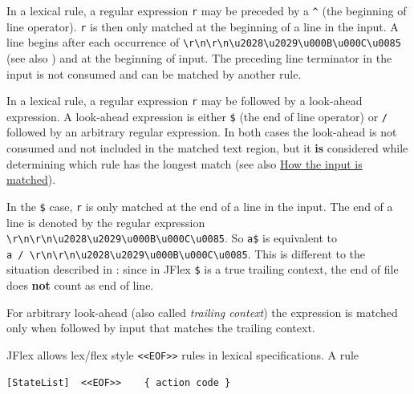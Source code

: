 In a lexical rule, a regular expression \texttt{r} may be preceded by a
\texttt{\^{}} (the beginning of line operator). \texttt{r} is then only
matched at the beginning of a line in the input. A line begins after
each occurrence of
\texttt{\textbackslash{}r\textbar{}\textbackslash{}n\textbar{}\textbackslash{}r\textbackslash{}n\textbar{}\textbackslash{}u2028\textbar{}\textbackslash{}u2029\textbar{}\textbackslash{}u000B\textbar{}\textbackslash{}u000C\textbar{}\textbackslash{}u0085}
(see also \autocite{unicode_rep}) and at the beginning of input. The
preceding line terminator in the input is not consumed and can be
matched by another rule.

In a lexical rule, a regular expression \texttt{r} may be followed by a
look-ahead expression. A look-ahead expression is either \texttt{\$}
(the end of line operator) or \texttt{/} followed by an arbitrary
regular expression. In both cases the look-ahead is not consumed and not
included in the matched text region, but it \textbf{is} considered while
determining which rule has the longest match (see also
\hyperref[HowMatched]{How the input is matched}).

In the \texttt{\$} case, \texttt{r} is only matched at the end of a line
in the input. The end of a line is denoted by the regular expression
\texttt{\textbackslash{}r\textbar{}\textbackslash{}n\textbar{}\textbackslash{}r\textbackslash{}n\textbar{}\textbackslash{}u2028\textbar{}\textbackslash{}u2029\textbar{}\textbackslash{}u000B\textbar{}\textbackslash{}u000C\textbar{}\textbackslash{}u0085}.
So \texttt{a\$} is equivalent to
\texttt{a\ /\ \textbackslash{}r\textbar{}\textbackslash{}n\textbar{}\textbackslash{}r\textbackslash{}n\textbar{}\textbackslash{}u2028\textbar{}\textbackslash{}u2029\textbar{}\textbackslash{}u000B\textbar{}\textbackslash{}u000C\textbar{}\textbackslash{}u0085}.
This is different to the situation described in \autocite{unicode_rep}:
since in JFlex \texttt{\$} is a true trailing context, the end of file
does \textbf{not} count as end of line.

For arbitrary look-ahead (also called \emph{trailing context}) the
expression is matched only when followed by input that matches the
trailing context.

JFlex allows lex/flex style
\texttt{\textless{}\textless{}EOF\textgreater{}\textgreater{}} rules in
lexical specifications. A rule

\begin{verbatim}
[StateList]  <<EOF>>    { action code }
\end{verbatim}

